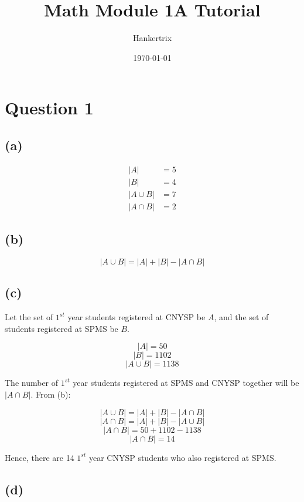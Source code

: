 \documentclass[11pt]{article}
\author{Hankertrix}
\date{\today}
\title{Math Module 1A Tutorial}
\begin{document}
\maketitle
\setcounter{tocdepth}{2}
\tableofcontents

\newpage

\section{Question 1}
\label{sec:orgadf87b2}

\subsection{(a)}
\label{sec:org4bdcd61}

\begin{align*}
|A| &= 5 \\
|B| &= 4 \\
|A \cup B| &= 7 \\
|A \cap B| &= 2
\end{align*}


\subsection{(b)}
\label{sec:orge3e0b1d}

\[|A \cup B| = |A| + |B| - |A \cap B|\]


\subsection{(c)}
\label{sec:orgaa29ad8}

Let the set of \(1^{st}\) year students registered at CNYSP be \(A\), and the set of students registered at SPMS be \(B\).

\[|A| = 50\]
\[|B| = 1102\]
\[|A \cup B| = 1138\]

The number of \(1^{st}\) year students registered at SPMS and CNYSP together will be \(|A \cap B|\). From (b):

\[|A \cup B| = |A| + |B| - |A \cap B| \]
\[|A \cap B| = |A| + |B| - |A \cup B| \]
\[|A \cap B| = 50 + 1102 - 1138 \]
\[|A \cap B| = 14\]

Hence, there are 14 \(1^{st}\) year CNYSP students who also registered at SPMS.


\subsection{(d)}
\label{sec:org4a9079a}
\end{document}
